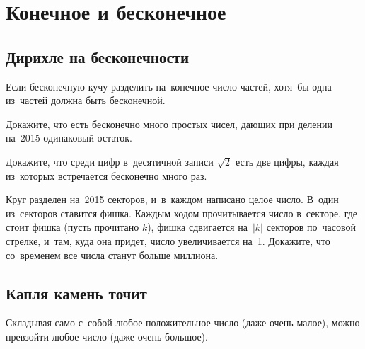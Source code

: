 
\section*{Конечное и бесконечное}



\subsection*{Дирихле на бесконечности}

Если бесконечную кучу разделить на~конечное число частей, хотя~бы одна
из~частей должна быть бесконечной.

\begin{problems}

\item
Докажите, что есть бесконечно много простых чисел, дающих при делении на~2015
одинаковый остаток.

\item
Докажите, что среди цифр в~десятичной записи $\sqrt{2}$ есть две цифры, каждая
из~которых встречается бесконечно много раз.

\item
Круг разделен на~2015 секторов, и~в~каждом написано целое число.
В~один из~секторов ставится фишка.
Каждым ходом прочитывается число в~секторе, где стоит фишка
(пусть прочитано $k$), фишка сдвигается на~$|k|$ секторов по~часовой стрелке,
и~там, куда она придет, число увеличивается на~1.
Докажите, что со~временем все числа станут больше миллиона.

\end{problems}

\subsection*{Капля камень точит}

Складывая само с~собой любое положительное число (даже очень малое), можно
превзойти любое число (даже очень большое).

